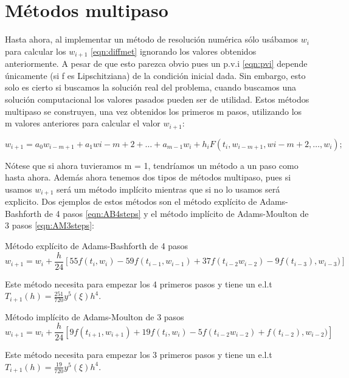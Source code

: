 \section{Métodos multipaso}
Hasta ahora, al implementar un método de resolución numérica sólo usábamos 
$w_i$ para calcular los $w_{i+1}$ \ref{eqn:diffmet} ignorando los valores obtenidos 
anteriormente. A pesar de que esto parezca obvio pues un p.v.i \ref{eqn:pvi} 
depende únicamente (si f es Lipschitziana) de la condición inicial dada. 
Sin embargo, esto solo es cierto si buscamos la solución real del problema, 
cuando buscamos una solución computacional los valores pasados pueden ser de utilidad.
Estos métodos multipaso se construyen, una vez obtenidos los primeros m pasos, 
utilizando los m valores anteriores para calcular el valor $w_{i+1}$:

\begin{equation} \label{eqn:multistep}
w_{i+1} = a_0w_{i-m+1} + a_1w{i-m+2} + \dots + a_{m-1}w_i + h_iF(t_i,w_{i-m+1},w{i-m+2},\dots,w_i);
\end{equation}

Nótese que si ahora tuvieramos m = 1, tendríamos un método a un paso como hasta ahora. 
Además ahora tenemos dos tipos de métodos multipaso, pues si usamos $w_{i+1}$ 
será um método implícito mientras que si no lo usamos será explicito.
Dos ejemplos de estos métodos son el método explícito de Adams-Bashforth 
de 4 pasos \ref{eqn:AB4steps} y el método implícito de Adams-Moulton de 
3 pasos \ref{eqn:AM3steps}:%

\begin{method} 
    Método explícito de Adams-Bashforth de 4 pasos
    \begin{equation} \label{eqn:AB4steps}
        w_{i+1} = w_i + \frac{h}{24}[
                            55f(t_i,w_i) - 59f(t_{i-1},w_{i-1}) + 37f(t_{i-2}w_{i-2}) - 9f(t_{i-3}),w_{i-3})
                        ]
    \end{equation}
\end{method}
    
Este método necesita para empezar los 4 primeros pasos y 
tiene un e.l.t $T_{i+1}(h) = \frac{251}{720}y^5(\xi)h^4$. 


\begin{method} 
    Método implícito de Adams-Moulton de 3 pasos
    \begin{equation} \label{eqn:AM3steps}
        w_{i+1} = w_i + \frac{h}{24}[
                            9f(t_{i+1},w_{i+1}) + 19f(t_i,w_i) - 5f(t_{i-2}w_{i-2}) + f(t_{i-2}),w_{i-2})
                            ]
    \end{equation}   
\end{method}
Este método necesita para empezar los 3 primeros pasos y 
tiene un e.l.t $T_{i+1}(h) = \frac{19}{720}y^5(\xi)h^4$. 

